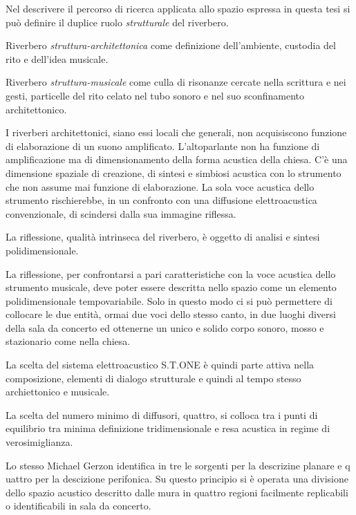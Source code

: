 Nel descrivere il percorso di ricerca applicata allo spazio espressa in questa
tesi si può definire il duplice ruolo \emph{strutturale} del riverbero.

Riverbero \emph{struttura-architettonica} come definizione dell'ambiente,
custodia del rito e dell'idea musicale.

Riverbero \emph{struttura-musicale} come culla di risonanze cercate nella
scrittura e nei gesti, particelle del rito celato nel tubo sonoro e nel suo sconfinamento architettonico.

I riverberi architettonici, siano essi locali che generali, non acquisiscono funzione di elaborazione
di un suono amplificato. L'altoparlante non ha funzione di amplificazione ma di dimensionamento della forma
acustica della chiesa. C'è una dimensione spaziale di creazione, di sintesi e simbiosi acustica con lo strumento
che non assume mai funzione di elaborazione. La sola voce acustica dello strumento rischierebbe,
in un confronto con una diffusione elettroacustica convenzionale, di scindersi dalla sua immagine riflessa.

La riflessione, qualità intrinseca del riverbero, è oggetto di analisi e sintesi polidimensionale. 

La riflessione, per confrontarsi a pari caratteristiche con la voce acustica dello strumento musicale,
deve poter essere descritta nello spazio come un elemento polidimensionale tempovariabile.
Solo in questo modo ci si può permettere di collocare le due entità, ormai due voci dello
stesso canto, in due luoghi diversi della sala da concerto ed ottenerne un unico e solido
corpo sonoro, mosso e stazionario come nella chiesa. 

La scelta del sistema elettroacustico S.T.ONE è quindi parte attiva nella composizione,
elementi di dialogo strutturale e quindi al tempo stesso archiettonico e musicale.

La scelta del numero minimo di diffusori, quattro, si colloca tra i punti di equilibrio tra
minima definizione tridimensionale e resa acustica in regime di verosimiglianza.  

Lo stesso Michael Gerzon identifica in tre le sorgenti per la descrizine planare e q	uattro per la descizione perifonica.
Su questo principio si è operata una divisione dello spazio acustico descritto dalle mura in quattro regioni facilmente 
replicabili o identificabili in sala da concerto.






